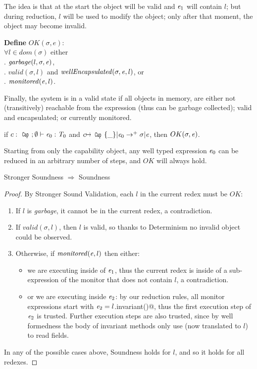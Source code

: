 The idea is that at the start the object will be valid and ${\mathit{e}}_1$ will contain $l$;
but during reduction, $l$ will be used to
modify the object; only after that moment, the object may become invalid.


\noindent\textbf{Define} $OK(\sigma,e)$:\\
\indent $\forall l\in\textit{dom}(\sigma)$
  either\\
\indent{}. $\mathit{garbage}(l,\sigma,\e)$,\\
\indent{}. $\mathit{valid}(\sigma,l)$ and $\mathit{wellEncapsulated}(\sigma,\e,l)$, or\\
\indent{}. $\mathit{monitored}({\mathit{e}},l)$.

Finally, the system is in a valid state
if all objects in memory, are either
not (transitively) reachable from the expression (thus can be garbage collected);
valid and encapsulated;
or currently monitored.

\begin{theorem}
if $c:\Kw{Cap};\emptyset\vdash \e_0: \T_0$ and
$c\mapsto\Kw{Cap}\{\_\}|\e_0\rightarrow^+ \sigma|\e$, then
$OK(\sigma,\e)$.
\end{theorem}
\noindent Starting from only the capability object,
any well typed expression ${\mathit{e}}_0$ can be reduced in an arbitrary number of steps,
and $OK$ will always hold.

\begin{theorem} Stronger Soundness $\Rightarrow$ Soundness
\end{theorem}
\begin{proof}
\noindent By Stronger Sound Validation, each $l$ in the current redex must be $OK$:
\begin{enumerate}
	\item If $l$ is \emph{garbage}, it cannot be in the current redex, a contradiction.
	\item If $\mathit{valid}(\sigma,l)$, then $l$ is valid, so thanks to Determinism
	no invalid object could be observed.
	\item Otherwise, if $\mathit{monitored}({\mathit{e}},l)$ then either:
	\begin{itemize}
	 \item we are executing inside of ${\mathit{e}}_1$, thus the current redex is inside of a sub-expression of the monitor that does not contain $l$, a contradiction.
	 \item or we are executing inside ${\mathit{e}}_2$:
	 by our reduction rules, all monitor expressions start with
	 ${\mathit{e}}_2=l$\Q@.invariant()@, thus the first execution step
	 of ${\mathit{e}}_2$ is trusted. Further execution steps are also trusted, since by well formedness the body of invariant methods only use \Q@this@ (now translated to $l$) to read fields.
	\end{itemize}
\end{enumerate}
In any of the possible cases above, Soundness holds for $l$, and so it holds for all redexes.
\end{proof}

